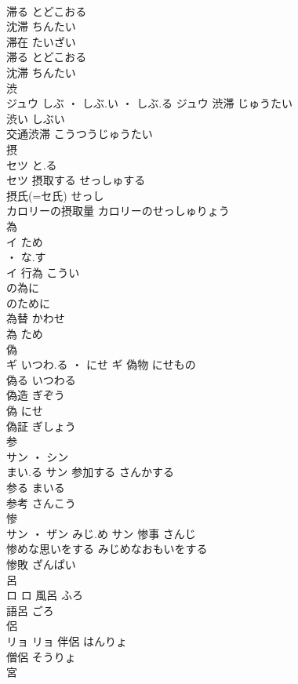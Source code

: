 \documentclass[8pt]{extreport}
\begin{document}
\begin{CJK}{UTF8}{min}
\\	滞る	とどこおる	
\\	沈滞	ちんたい	
\\	滞在	たいざい	
\\	滞る	とどこおる	
\\	沈滞	ちんたい	
\\	渋	
\\	ジュウ	しぶ ・ しぶ.い ・ しぶ.る	ジュウ	渋滞	じゅうたい	
\\	渋い	しぶい	
\\	交通渋滞	こうつうじゅうたい	
\\	摂	
\\	セツ	と.る
\\	セツ	摂取する	せっしゅする	
\\	摂氏(=セ氏)	せっし	
\\	カロリーの摂取量	カロリーのせっしゅりょう	
\\	為	
\\	イ	ため
\\	・ な.す
\\	イ	行為	こうい	
\\	の為に	
\\	のために	
\\	為替	かわせ	
\\	為	ため	
\\	偽	
\\	ギ	いつわ.る ・ にせ	ギ	偽物	にせもの	
\\	偽る	いつわる	
\\	偽造	ぎぞう	
\\	偽	にせ	
\\	偽証	ぎしょう	
\\	参	
\\	サン ・ シン
\\	まい.る	サン	参加する	さんかする	
\\	参る	まいる	
\\	参考	さんこう	
\\	惨	
\\	サン ・ ザン	みじ.め	サン	惨事	さんじ	
\\	惨めな思いをする	みじめなおもいをする	
\\	惨敗	ざんぱい	
\\	呂	
\\	ロ		ロ	風呂	ふろ	
\\	語呂	ごろ	
\\	侶	
\\	リョ		リョ	伴侶	はんりょ	
\\	僧侶	そうりょ	
\\	宮	

\end{CJK}
\end{document}
